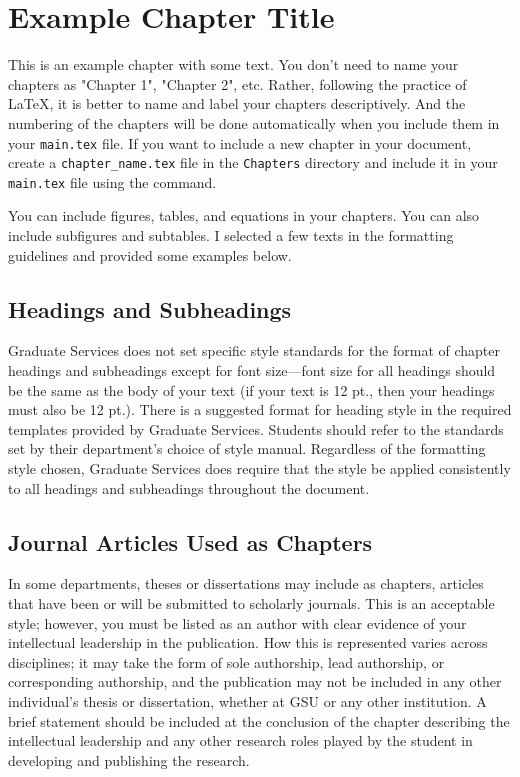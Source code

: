 \chapter{Example Chapter Title}
\label{chap:example_chapter}

This is an example chapter with some text. You don't need to name your chapters as "Chapter 1", "Chapter 2", etc. Rather, following the practice of \LaTeX, it is better to name and label your chapters descriptively. And the numbering of the chapters will be done automatically when you include them in your \verb|main.tex| file. If you want to include a new chapter in your document, create a \verb|chapter_name.tex| file in the \verb|Chapters| directory and include it in your \verb|main.tex| file using the \verb|| command.

You can include figures, tables, and equations in your chapters. You can also include subfigures and subtables. I selected a few texts in the formatting guidelines and provided some examples below.

\section{Headings and Subheadings}
\label{sec:headings}

Graduate Services does not set specific style standards for the format of chapter headings and subheadings except for font size—font size for all headings should be the same as the body of your text (if your text is 12 pt., then your headings must also be 12 pt.). There is a suggested format for heading style in the required templates provided by Graduate Services. Students should refer to the standards set by their department's choice of style manual. Regardless of the formatting style chosen, Graduate Services does require that the style be applied consistently to all headings and subheadings throughout the document. 


\section{Journal Articles Used as Chapters}
\label{sec:journal_articles}
In some departments, theses or dissertations may include as chapters, articles that have been or will be submitted to scholarly journals. This is an acceptable style; however, you must be listed as an author with clear evidence of your intellectual leadership in the publication. How this is represented varies across disciplines; it may take the form of sole authorship, lead authorship, or corresponding authorship, and the publication may not be included in any other individual's thesis or dissertation, whether at GSU or any other institution. A brief statement should be included at the conclusion of the chapter describing the intellectual leadership and any other research roles played by the student in developing and publishing the research. 
 
